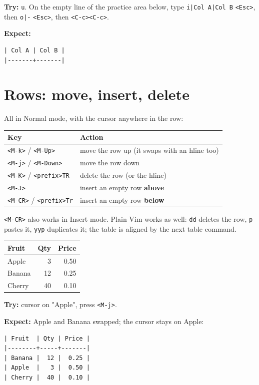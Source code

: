 \textbf{Try:} \texttt{u}. On the empty line of the practice area below, type
\texttt{i|Col A|Col B} \texttt{<Esc>}, then \texttt{o|-} \texttt{<Esc>}, then \texttt{<C-c><C-c>}.

\textbf{Expect:}
\begin{verbatim}
| Col A | Col B |
|-------+-------|
\end{verbatim}
\section{Rows: move, insert, delete}
\label{sec:org6d2fcfd}
All in Normal mode, with the cursor anywhere in the row:

\begin{center}
\begin{tabular}{ll}
Key & Action\\
\hline
\texttt{<M-k>} / \texttt{<M-Up>} & move the row up (it swaps with an hline too)\\
\texttt{<M-j>} / \texttt{<M-Down>} & move the row down\\
\texttt{<M-K>} / \texttt{<prefix>TR} & delete the row (or the hline)\\
\texttt{<M-J>} & insert an empty row \textbf{above}\\
\texttt{<M-CR>} / \texttt{<prefix>Tr} & insert an empty row \textbf{below}\\
\end{tabular}
\end{center}

\texttt{<M-CR>} also works in Insert mode. Plain Vim works as well: \texttt{dd} deletes
the row, \texttt{p} pastes it, \texttt{yyp} duplicates it; the table is aligned by the
next table command.

\begin{table}[htbp]
\label{tab:orgcb89e30}
\centering
\begin{tabular}{lrr}
Fruit & Qty & Price\\
\hline
Apple & 3 & 0.50\\
Banana & 12 & 0.25\\
Cherry & 40 & 0.10\\
\end{tabular}
\end{table}

\textbf{Try:} cursor on "Apple", press \texttt{<M-j>}.

\textbf{Expect:} Apple and Banana swapped; the cursor stays on Apple:
\begin{verbatim}
| Fruit  | Qty | Price |
|--------+-----+-------|
| Banana |  12 |  0.25 |
| Apple  |   3 |  0.50 |
| Cherry |  40 |  0.10 |
\end{verbatim}

